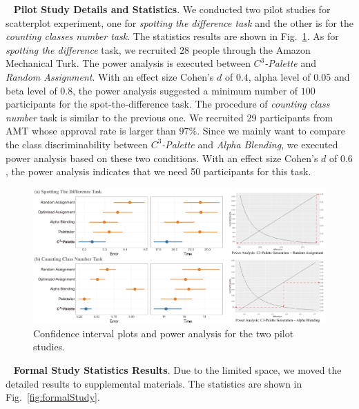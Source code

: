 \documentclass[review,onecolumn]{vgtc}                %
\newcommand{\myparagraph}[1]{\mbox{\ } \newline \noindent \textbf{#1}}
\renewcommand{\paragraph}[1]{\myparagraph{#1}}
\begin{document}
\paragraph{Pilot Study Details and Statistics}.
We conducted two pilot studies for scatterplot experiment, one for \emph{spotting the difference task} and the other is for the \emph{counting classes number task}. The statistics results are shown in Fig.~\ref{fig:pilotResults}.
As for \emph{spotting the difference} task, we recruited $28$ people through the Amazon Mechanical Turk. The power analysis is executed between \emph{$C^3$-Palette} and \emph{Random Assignment}. With an effect size Cohen's $d$ of $0.4$, alpha level of $0.05$ and beta level of $0.8$, the power analysis suggested a minimum number of $100$ participants for the spot-the-difference task.
The procedure of \emph{counting class number} task is similar to the previous one. We recruited 29 participants from AMT whose approval rate is larger than $97\%$. Since we mainly want to compare the class discriminability between \emph{$C^3$-Palette} and \emph{Alpha Blending}, we executed power analysis based on these two conditions.  With an effect size Cohen's $d$ of $0.6$, the power analysis indicates that we need 50 participants for this task.

\begin{figure}[h]
\centering
\includegraphics[width=1\linewidth]{user-result-pilot.pdf}
\caption{Confidence interval plots and power analysis for the two pilot studies.
}
\vspace*{-5mm}
\label{fig:pilotResults}
\end{figure}


\paragraph{Formal Study Statistics Results}.
Due to the limited space, we moved the detailed results to supplemental materials. The statistics are shown in Fig.~\ref{fig:formalStudy}.
\end{document}
